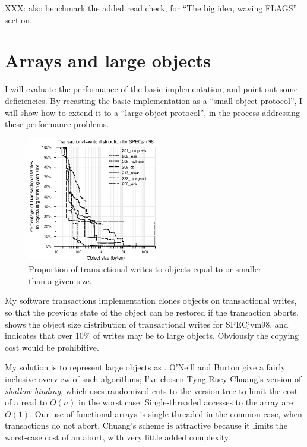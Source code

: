 XXX: also benchmark the added read check, for ``The big idea, waving
FLAGS'' section.


\chapter{Arrays and large objects}\label{sec:largeobj}
I will evaluate the performance of the basic implementation, and point
out some deficiencies.  By recasting the basic implementation as a
``small object protocol'', I will show how to extend it to a ``large
object protocol'', in the process addressing these performance
problems.

\begin{figure}
\begin{center}
\includegraphics[width=2.25in,clip=true]{Figures/tr-w-all.eps}%
\end{center}%
\caption{Proportion of transactional writes to objects equal to or
  smaller than a given size.}
\label{fig:tr-w}%
\end{figure}%
My software transactions implementation clones objects on
transactional writes, so that the previous state of the object can be
restored if the transaction aborts.   shows the object
size distribution of transactional writes for SPECjvm98, and
indicates that over 10\% of writes may be to large objects.
Obviously the copying cost would be prohibitive.

My solution is to represent large objects as .  O'Neill and Burton \cite{ONeillBu97} give a fairly
inclusive overview of such algorithms; I've chosen Tyng-Ruey Chuang's
version \cite{Chuang94} of \emph{shallow binding}, which uses
randomized cuts to the version tree to limit the cost of a read to
$O(n)$ in the worst case.  Single-threaded accesses to the array are
$O(1)$.  Our use of functional arrays is single-threaded in the common
case, when transactions do not abort.  Chuang's scheme is attractive
because it limits the worst-case cost of an abort, with very little
added complexity.

